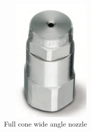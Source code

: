 \begin{figure}[!htpb]
  \centering
  \includegraphics[width = 5cm, height=6cm ]{figures/nzl}
  \caption{Full cone wide angle nozzle}
  \label{fig:nzl}
\end{figure}

